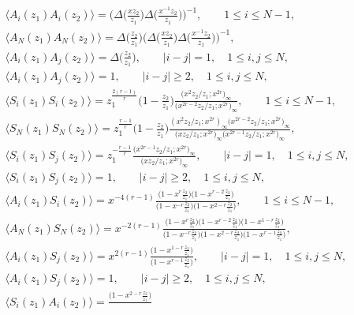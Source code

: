 \documentclass[pdftex]{sigma}
\numberwithin{equation}{section}
\begin{document}
\begin{gather}
\langle A_i(z_1)A_i(z_2)\rangle
=\bigg(\Delta\bigg(\frac{xz_2}{z_1}\bigg)
\Delta\bigg(\frac{x^{-1}z_2}{z_1}\bigg)\bigg)^{-1},\qquad
1\leq i \leq N-1,\nonumber
\\
\langle A_N(z_1)A_N(z_2)\rangle
=\Delta\bigg(\frac{z_2}{z_1}\bigg)
\bigg(\Delta\bigg(\frac{x z_2}{z_1}\bigg)
\Delta\bigg(\frac{x^{-1}z_2}{z_1}\bigg)\bigg)^{-1},\nonumber
\\
\langle A_i(z_1)A_j(z_2)\rangle
=\Delta\bigg(\frac{z_2}{z_1}\bigg),\qquad
|i-j|=1,\quad 1\leq i, j \leq N,\nonumber
\\
\langle A_i(z_1)A_j(z_2)\rangle=1,\qquad
|i-j|\geq 2,\quad 1\leq i, j \leq N,\label{appendix:A}
\\
\langle S_i(z_1)S_i(z_2)\rangle
=z_1^{\frac{2(r-1)}{r}}\bigg(1-\frac{z_2}{z_1}\bigg)
\frac{\big(x^2z_2/z_1;x^{2r}\big)_\infty}{\big(x^{2r-2}z_2/z_1;x^{2r}\big)_\infty},\qquad
1\leq i \leq N-1,\nonumber
\\
\langle S_N(z_1)S_N(z_2)\rangle
=z_1^{\frac{r-1}{r}}\bigg(1-\frac{z_2}{z_1}\bigg)
\frac{(x^2z_2/z_1;x^{2r})_\infty \big(x^{2r-2}z_2/z_1;x^{2r}\big)_\infty}{
\big(xz_2/z_1;x^{2r}\big)_\infty \big(x^{2r-1}z_2/z_1;x^{2r}\big)_\infty},\nonumber
\\
\langle S_i(z_1)S_j(z_2)\rangle
=z_1^{-\frac{r-1}{r}}\frac{\big(x^{2r-1}z_2/z_1;x^{2r}\big)_\infty}{\big(xz_2/z_1;x^{2r}\big)_\infty},\qquad
|i-j|=1,\quad 1\leq i,j \leq N,\nonumber
\\
\langle S_i(z_1)S_j(z_2)\rangle=1,\qquad
|i-j|\geq 2,\quad 1\leq i, j \leq N,
\label{appendix:S}
\\
\langle A_i(z_1)S_i(z_2)\rangle=x^{-4(r-1)}
\frac{\big(1-x^r\frac{z_2}{z_1}\big)\big(1-x^{r-2}\frac{z_2}{z_1}\big)}{
\big(1-x^{-r}\frac{z_2}{z_1}\big)\big(1-x^{2-r}\frac{z_2}{z_1}\big)},\qquad
1\leq i \leq N-1,\nonumber
\\
\langle A_N(z_1)S_N(z_2)\rangle=x^{-2(r-1)}\frac{
\big(1-x^r\frac{z_2}{z_1}\big)\big(1-x^{r-2}\frac{z_2}{z_1}\big)
\big(1-x^{1-r}\frac{z_2}{z_1}\big)}{\big(1-x^{-r}\frac{z_2}{z_1}\big)
\big(1-x^{2-r}\frac{z_2}{z_1}\big)\big(1-x^{r-1}\frac{z_2}{z_1}\big)},
\\
\langle A_i(z_1)S_j(z_2)\rangle
=x^{2(r-1)}\frac{\big(1-x^{1-r}\frac{z_2}{z_1}\big)}{\big(1-x^{r-1}\frac{z_2}{z_1}\big)},\qquad
|i-j|=1,\quad 1\leq i,j \leq N,\nonumber
\\
\langle A_i(z_1)S_j(z_2)\rangle=1,\qquad
|i-j|\geq 2,\quad 1\leq i,j \leq N,
\label{appendix:AS}
\\
\langle S_i(z_1)A_i(z_2)\rangle=\frac{\big(1-x^{2-r}\frac{z_2}{z_1}\big)}{
}
\end{gather}
\end{document}
